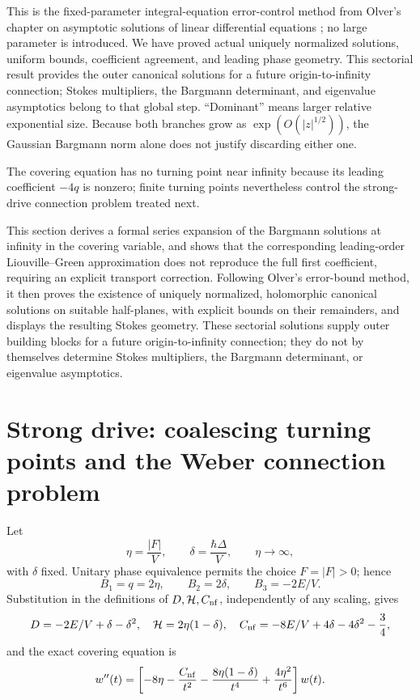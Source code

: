 \documentclass[11pt]{article}
\theoremstyle{remark}
\begin{document}
This is the fixed-parameter integral-equation error-control method from
Olver's chapter on asymptotic solutions of linear differential equations
\cite{Olver1997Asymptotics}; no large parameter is introduced.  We have
proved actual uniquely normalized solutions, uniform bounds, coefficient
agreement, and leading phase geometry.  This sectorial result provides the
outer canonical solutions for a future origin-to-infinity connection; Stokes
multipliers, the Bargmann determinant, and eigenvalue asymptotics belong to
that global step.  ``Dominant'' means larger relative exponential size.
Because both branches grow as \(\exp(O(|z|^{1/2}))\), the Gaussian Bargmann
norm alone does not justify discarding either one.

The covering equation has no turning point near infinity because its leading
coefficient \(-4q\) is nonzero; finite turning points nevertheless control the
strong-drive connection problem treated next.

This section derives a formal series expansion of the Bargmann solutions at
infinity in the covering variable, and shows that the corresponding
leading-order Liouville--Green approximation does not reproduce the full
first coefficient, requiring an explicit transport correction.  Following
Olver's error-bound method, it then proves the existence of uniquely
normalized, holomorphic canonical solutions on suitable half-planes, with
explicit bounds on their remainders, and displays the resulting Stokes
geometry.  These sectorial solutions supply outer building blocks for a
future origin-to-infinity connection; they do not by themselves determine
Stokes multipliers, the Bargmann determinant, or eigenvalue asymptotics.

\section{Strong drive: coalescing turning points and the Weber connection problem}
\label{sec:strong-drive}
\label{subsec:strong-drive-olver}

Let
\begin{equation}
 \eta=\frac{|F|}{V},\qquad \delta=\frac{\hbar\Delta}{V},
 \qquad \eta\longrightarrow\infty,
 \label{eq:strong-drive-parameters}
\end{equation}
with \(\delta\) fixed.  Unitary phase equivalence permits the choice
\(F=|F|>0\); hence
\begin{equation}
 B_1=q=2\eta,\qquad B_2=2\delta,\qquad B_3=-2E/V.
 \label{eq:strong-drive-WI-map}
\end{equation}
Substitution in the definitions of \(D,\mathcal{H},C_{\rm nf}\), independently of any scaling,
gives
\begin{equation}
 D=-2E/V+\delta-\delta^2,\quad \mathcal{H}=2\eta(1-\delta),\quad
 C_{\rm nf}=-8E/V+4\delta-4\delta^2-\frac34,
\end{equation}
and the exact covering equation is
\begin{equation}
 w''(t)=\left[-8\eta-\frac{C_{\rm nf}}{t^2}
 -\frac{8\eta(1-\delta)}{t^4}+\frac{4\eta^2}{t^6}\right]w(t).
 \label{eq:strong-drive-exact-cover}
\end{equation}
\end{document}
